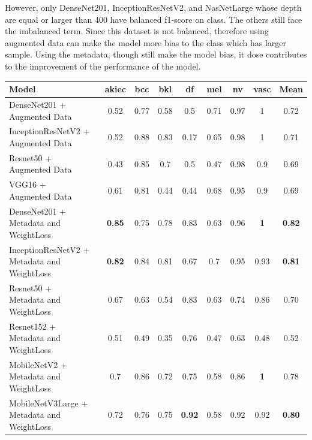 \FloatBarrier
However, only DenseNet201, InceptionResNetV2, and NasNetLarge whose depth are equal or larger than 400 have balanced f1-score on class. The others still face the imbalanced term. Since this dataset is not balanced, therefore using augmented data can make the model more  bias to the class which has larger sample. Using the metadata, though still make the model bias, it dose contributes to the improvement of  the performance of the model.\\ 
\FloatBarrier
\begin{table}[h]
	\centering
	\begin{tabular}{|l | c | c | c | c | c | c | c | c|} 
		\hline
		Model & akiec & bcc & bkl & df & mel & nv & vasc & Mean \\
		\hline
		\thead{DenseNet201 +\\ Augmented Data} & 0.52 & 0.77 & 0.58 & 0.5 & 0.71 & 0.97 & 1 & 0.72\\ 
		\hline
		\thead{InceptionResNetV2 +\\ Augmented Data} & 0.52 & 0.88 & 0.83 & 0.17 & 0.65 & 0.98 & 1 & 0.71\\
		\hline
		\thead{Resnet50 +\\ Augmented Data} & 0.43 & 0.85 & 0.7 & 0.5 & 0.47 & 0.98 & 0.9 & 0.69\\
		\hline 	
		\thead{VGG16 +\\ Augmented Data} & 0.61 & 0.81 & 0.44 & 0.44 & 0.68 & 0.95 & 0.9 & 0.69\\ 
		\hline		
		\thead{DenseNet201 +\\Metadata and WeightLoss} & \textbf{0.85} & 0.75 & 0.78 & 0.83 & 0.63 & 0.96 & \textbf{1} & \textbf{0.82}\\
		\hline
		\thead{InceptionResNetV2 +\\Metadata and WeightLoss} & \textbf{0.82} & 0.84 & 0.81 & 0.67 & 0.7 & 0.95 & 0.93 & \textbf{0.81}\\
		\hline
		\thead{Resnet50 +\\Metadata and WeightLoss} & 0.67 & 0.63 & 0.54 & 0.83 & 0.63 & 0.74 & 0.86 & 0.70\\
		\hline
		\thead{Resnet152 +\\Metadata and WeightLoss} & 0.51 & 0.49 & 0.35 & 0.76 & 0.47 & 0.63 & 0.48 & 0.52\\
		\hline
		\thead{MobileNetV2 +\\Metadata and WeightLoss} & 0.7 & 0.86 & 0.72 & 0.75 & 0.58 & 0.86 & \textbf{1} & 0.78\\
		\hline
		\thead{MobileNetV3Large +\\Metadata and WeightLoss} & 0.72 & 0.76 & 0.75 & \textbf{0.92} & 0.58 & 0.92 & 0.92 & \textbf{0.80}\\

\end{tabular}
\end{table}

